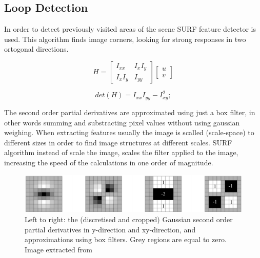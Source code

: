 \subsection{Loop Detection}

In order to detect previously visited areas of the scene SURF \cite{Bay06surf} feature detector 
is used. This algorithm finds image corners, looking for strong responses in two ortogonal directions. 


$$
H = \begin{bmatrix} I_{xx} & I_x I_y \\ I_x I_y & I_{yy} \end{bmatrix} \begin{bmatrix} u \\ v \end{bmatrix}
$$

$$
det(H) = I_{xx} I_{yy} - I_{xy}^2;
$$


The second order partial derivatives are approximated using just a box filter, in other words 
summing and substracting pixel values without using gaussian weighing. When extracting features 
usually the image is scalled (scale-space) to different sizes in order to find image structures 
at different scales. SURF algorithm instead of scale the image, scales the filter applied to the 
image, increasing the speed of the calculations in one order of magnitude.


\begin{figure}
\begin{center}
\includegraphics[scale=0.35]{images/surf_mask}
\caption{Left to right: the (discretised and cropped) Gaussian second order partial derivatives 
in y-direction and xy-direction, and approximations using box filters. 
Grey regions are equal to zero. Image extracted from \cite{Bay06surf}}
\end{center}
\end{figure}

